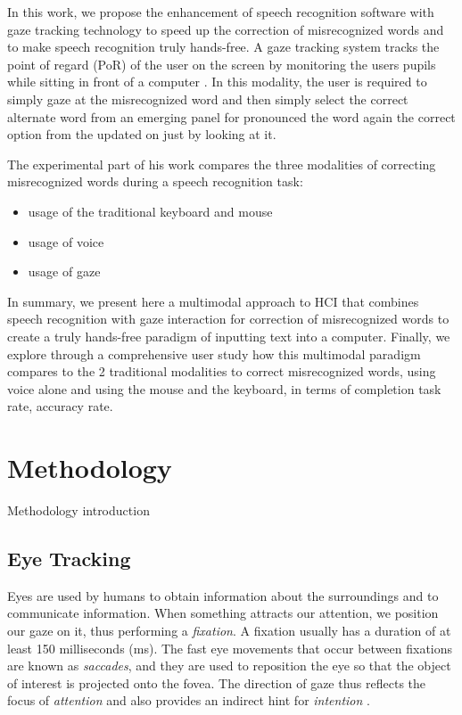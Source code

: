 \documentclass[]{article}
\begin{document}
 
In this work, we propose the enhancement of speech recognition software with gaze tracking technology to speed up the
correction of misrecognized words and to make speech recognition truly hands-free. A gaze tracking system tracks the
point of regard (PoR) of the user on the screen by monitoring the users pupils while sitting in front of a computer
\cite{Rozado2012a}. In this modality, the user is required to simply gaze at the misrecognized word and then simply
select  the correct alternate  word from an emerging panel for pronounced the word  again the correct option from the
updated on just  by looking at it.


The experimental part of his work compares the three modalities of correcting misrecognized words during  a speech
recognition task:
\begin{itemize}
  \item usage of the traditional keyboard and mouse
  \item usage of voice
  \item usage of gaze
\end{itemize}





In summary, we present here a multimodal approach to HCI that combines speech recognition with gaze 
interaction for correction of misrecognized words to create a truly hands-free paradigm of inputting text into a
computer. Finally, we explore through a comprehensive user study how this multimodal paradigm compares to the 2
traditional modalities to correct misrecognized words, using voice alone and using the mouse and the keyboard, in terms
of completion task rate, accuracy rate.

\section{Methodology}
Methodology introduction

\subsection{Eye Tracking}
Eyes are used by humans to obtain information about the surroundings and to
communicate information. When something attracts our attention, we position our
gaze on it, thus performing a \textit{fixation}. A fixation usually has a
duration of at least 150 milliseconds (ms). The fast eye movements that
occur between fixations are known as \textit{saccades}, and they are used to
reposition the eye so that the object of interest is projected onto the fovea.
The direction of gaze thus reflects the focus of 
\textit{attention} and also provides an indirect hint for \textit{intention}
\cite{velichkovsky}.
\end{document}
